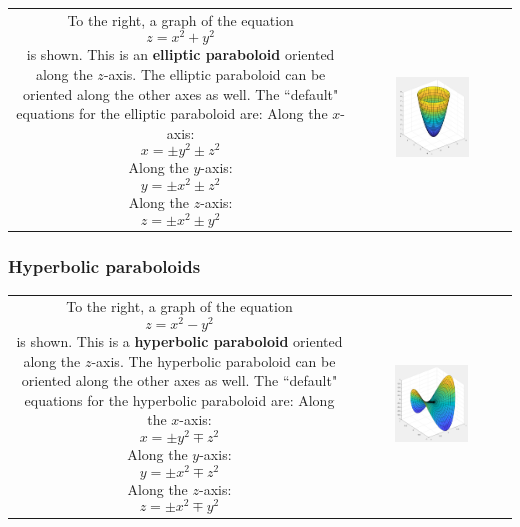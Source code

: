 \documentclass{article}
\begin{document}
\begin{tabular}{cc}
\parbox{0.5\textwidth}{
To the right, a graph of the equation 
\[z = x^2 + y^2\]
is shown. This is an {\bf elliptic paraboloid} oriented along the \(z\)-axis. The elliptic paraboloid can be oriented along the other axes as well. The ``default" equations for the elliptic paraboloid are: \\
Along the \(x\)-axis:
\[x = \pm y^2 \pm z^2\]
Along the \(y\)-axis:
\[y = \pm x^2 \pm z^2\]
Along the \(z\)-axis:
\[z = \pm x^2 \pm y^2\]
} & \parbox{0.5\textwidth}{
\includegraphics[width = 0.5\textwidth]{elliptic_paraboloid.png}
}
\end{tabular}




\subsubsection*{Hyperbolic paraboloids}

\begin{tabular}{cc}
\parbox{0.5\textwidth}{
To the right, a graph of the equation 
\[z = x^2 - y^2\]
is shown. This is a {\bf hyperbolic paraboloid} oriented along the \(z\)-axis. The hyperbolic paraboloid can be oriented along the other axes as well. The ``default" equations for the hyperbolic paraboloid are: \\
Along the \(x\)-axis:
\[x = \pm y^2 \mp z^2\]
Along the \(y\)-axis:
\[y = \pm x^2 \mp z^2\]
Along the \(z\)-axis:
\[z = \pm x^2 \mp y^2\]
} & \parbox{0.5\textwidth}{
\includegraphics[width = 0.5\textwidth]{hyperbolic_paraboloid.png}
}
\end{tabular}
\end{document}
